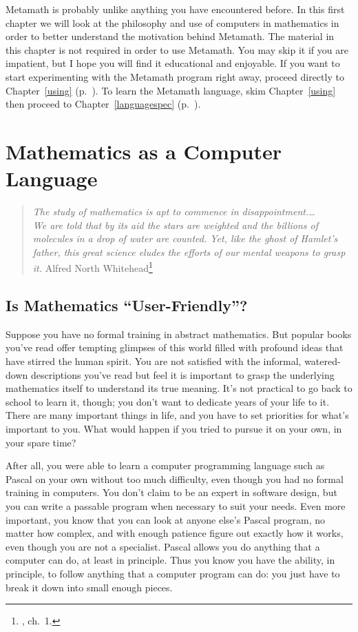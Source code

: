 Metamath is probably unlike anything you have
encountered before.  In this first chapter we will look at the philosophy and
use of computers in mathematics in order to better understand the motivation
behind Metamath.  The material in this chapter is not required in order to use
Metamath.  You may skip it if you are impatient, but I hope you will find it
educational and enjoyable.  If you want to start experimenting with the
Metamath program right away, proceed directly to Chapter~\ref{using}
(p.~\pageref{using}).  To
learn the Metamath language, skim Chapter~\ref{using} then proceed to
Chapter~\ref{languagespec} (p.~\pageref{languagespec}).

\section{Mathematics as a Computer Language}

\begin{quote}
  {\em The study of mathematics is apt to commence in
dis\-ap\-point\-ment.\ldots \\
We are told that by its aid the stars are weighted
and the billions of molecules in a drop of water are counted.  Yet, like the
ghost of Hamlet's father, this great science eludes the efforts of our mental
weapons to grasp it.}
  \flushright\sc  Alfred North Whitehead\footnote{\cite{Whitehead}, ch.\ 1.}\\
\end{quote}

\subsection{Is Mathematics ``User-Friendly''?}

Suppose you have no formal training in abstract mathematics.  But popular
books you've read offer tempting glimpses of this world filled with profound
ideas that have stirred the human spirit.  You are not satisfied with the
informal, watered-down descriptions you've read but feel it is important to
grasp the underlying mathematics itself to understand its true meaning. It's
not practical to go back to school to learn it, though; you don't want to
dedicate years of your life to it.  There are many important things in life,
and you have to set priorities for what's important to you.  What would happen
if you tried to pursue it on your own, in your spare time?

After all, you were able to learn a computer programming language such as
Pascal on your own without too much difficulty, even though you had no formal
training in computers.  You don't claim to be an expert in software design,
but you can write a passable program when necessary to suit your needs.  Even
more important, you know that you can look at anyone else's Pascal program, no
matter how complex, and with enough patience figure out exactly how it works,
even though you are not a specialist.  Pascal allows you do anything that a
computer can do, at least in principle.  Thus you know you have the ability,
in principle, to follow anything that a computer program can do:  you just
have to break it down into small enough pieces.

